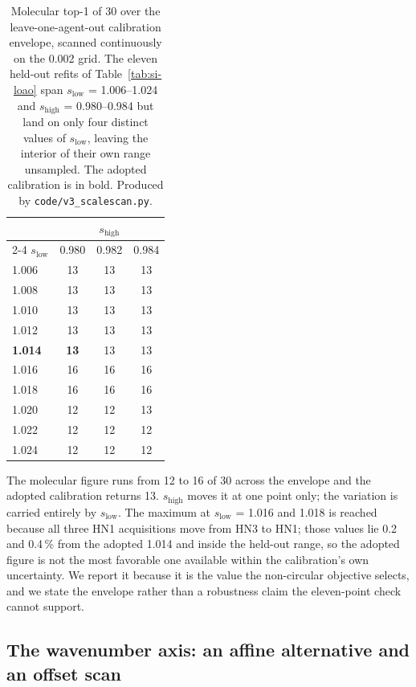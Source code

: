 \documentclass[11pt]{article}
\begin{document}
\begin{table}[htbp]
\centering
\caption{Molecular top-1 of 30 over the leave-one-agent-out calibration envelope,
scanned continuously on the 0.002 grid. The eleven held-out refits of
Table~\ref{tab:si-loao} span $s_\mathrm{low}$ = 1.006--1.024 and
$s_\mathrm{high}$ = 0.980--0.984 but land on only four distinct values of
$s_\mathrm{low}$, leaving the interior of their own range unsampled. The adopted
calibration is in bold. Produced by \texttt{code/v3\_scalescan.py}.}
\label{tab:si-scalescan}
\small
\begin{tabular}{lccc}
\toprule
 & \multicolumn{3}{c}{$s_\mathrm{high}$} \\
\cmidrule(lr){2-4}
$s_\mathrm{low}$ & 0.980 & 0.982 & 0.984 \\
\midrule
1.006 & 13 & 13 & 13 \\
1.008 & 13 & 13 & 13 \\
1.010 & 13 & 13 & 13 \\
1.012 & 13 & 13 & 13 \\
\textbf{1.014} & \textbf{13} & 13 & 13 \\
1.016 & 16 & 16 & 16 \\
1.018 & 16 & 16 & 16 \\
1.020 & 12 & 12 & 13 \\
1.022 & 12 & 12 & 12 \\
1.024 & 12 & 12 & 12 \\
\bottomrule
\end{tabular}

\begin{flushleft}\footnotesize The molecular figure runs from 12 to 16 of 30 across
the envelope and the adopted calibration returns 13. $s_\mathrm{high}$ moves it at
one point only; the variation is carried entirely by $s_\mathrm{low}$. The maximum at
$s_\mathrm{low}$ = 1.016 and 1.018 is reached because all three HN1 acquisitions move
from HN3 to HN1; those values lie 0.2 and 0.4\,\% from the adopted 1.014 and inside
the held-out range, so the adopted figure is not the most favorable one available
within the calibration's own uncertainty. We report it because it is the value the
non-circular objective selects, and we state the envelope rather than a robustness
claim the eleven-point check cannot support.\end{flushleft}
\end{table}

\subsection{The wavenumber axis: an affine alternative and an offset scan}
\label{si:axis}
\end{document}
